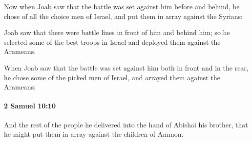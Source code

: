 			\begin{versebox}
					\item[BHS] 
					\item[ASV] Now when Joab saw that the battle was set against him before and behind, he chose of all the choice men of Israel, and put them in array against the Syrians:
					\item[NIV] Joab saw that there were battle lines in front of him and behind him; so he selected some of the best troops in Israel and deployed them against the Arameans.
					\item[NRSV] When Joab saw that the battle was set against him both in front and in the rear, he chose some of the picked men of Israel, and arrayed them against the Arameans;
			\end{versebox}

		\paragraph{2 Samuel 10:10} %
			\label{2SAMUEL-10-10}

			And the rest of the people he delivered into the hand of Abishai his brother, that he might put them in array against the children of Ammon.

